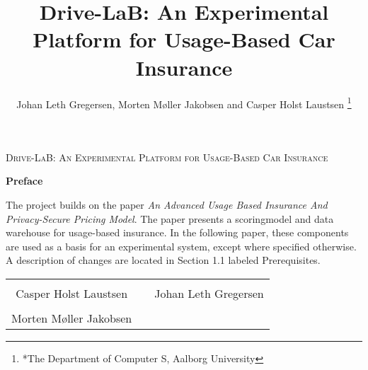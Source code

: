 \documentclass[a4paper, 10pt, conference]{IEEEconf}      %
\title{\LARGE \bf
Drive-LaB: An Experimental Platform for Usage-Based Car Insurance
}
\author{Johan Leth Gregersen, Morten Møller Jakobsen and Casper Holst Laustsen%
\thanks{*The Department of Computer S, Aalborg University}%
}
\begin{document}
\begin{titlepage}
	\centering
	{\scshape\LARGE Drive-LaB: An Experimental Platform for Usage-Based Car Insurance\par}
	\vspace{1.5cm}
	{\huge\bfseries Preface\par}
	\vspace{0.5cm}
	The project builds on the paper \textit{An Advanced Usage Based Insurance And Privacy-Secure Pricing Model}\citep{sw9_report}. The paper presents a scoringmodel and data warehouse for usage-based insurance. In the following paper, these components are used as a basis for an experimental system, except where specified otherwise. A description of changes are located in Section 1.1 labeled Prerequisites. 

\begin{table} [h]
	\centering
	\vspace{2cm}
		\begin{tabular}{c c c}
			\rowcolors{0}{}{}
			\underline{\phantom{JAERJAERJAERJAERGO}} & \phantom{cookies} & \underline{\phantom{JAERJAERJAERJAERGO}} \\
			Casper Holst Laustsen & \phantom{cookies} & Johan Leth Gregersen\\[1.5cm]
		    \rowcolor{white}\underline{\phantom{JAERJAERJAERJAERGO}} &\phantom{cookies} & {\phantom{JAERJAERJAERJAERGO}} \\
			Morten Møller Jakobsen & \phantom{cookies} & \\[1.5cm]				
		\end{tabular}
\end{table}

\end{titlepage}

\maketitle
\thispagestyle{empty}
\pagestyle{empty}

























\end{document}
